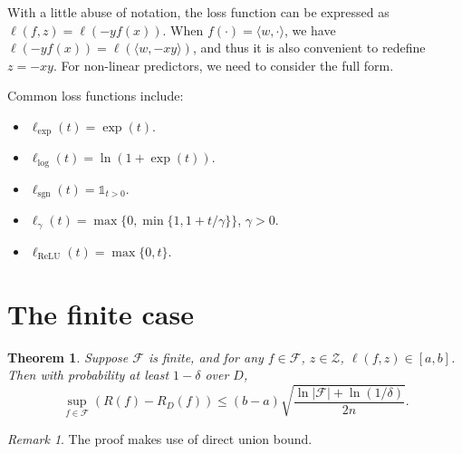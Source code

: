 \documentclass[openany]{book}
\newtheorem{theorem}{Theorem}[chapter]
\theoremstyle{definition}
\theoremstyle{remark}
\newtheorem*{remark}{Remark}
\begin{document}
With a little abuse of notation, the loss function can be expressed as $\ell(f,z)=\ell\left(-yf(x)\right)$. When $f(\cdot)=\langle w,\cdot\rangle$, we have $\ell(-yf(x))=\ell\left(\langle w,-xy\rangle\right)$, and thus it is also convenient to redefine $z=-xy$. For non-linear predictors, we need to consider the full form.

Common loss functions include:
\begin{itemize}
    \item $\ell_{\mathrm{exp}}(t)=\exp(t)$.
    \item $\ell_{\mathrm{log}}(t)=\ln\left(1+\exp(t)\right)$.
    \item $\ell_{\mathrm{sgn}}(t)=\mathds{1}_{t>0}$.
    \item $\ell_{\gamma}(t)=\max\{0,\min\{1,1+t/\gamma\}\}$, $\gamma>0$.
    \item $\ell_{\mathrm{ReLU}}(t)=\max\{0,t\}$.
\end{itemize}

\section{The finite case}
\begin{theorem}
    Suppose $\mathcal{F}$ is finite, and for any $f\in \mathcal{F}$, $z\in \mathcal{Z}$, $\ell(f,z)\in[a,b]$. Then with probability at least $1-\delta$ over $D$,
    \begin{equation*}
        \sup_{f\in \mathcal{F}}\left(R(f)-R_{D}(f)\right)\le(b-a)\sqrt{\frac{\ln|\mathcal{F}|+\ln(1/\delta)}{2n}}.
    \end{equation*}
\end{theorem}
\begin{remark}
    The proof makes use of direct union bound.
\end{remark}
\end{document}

